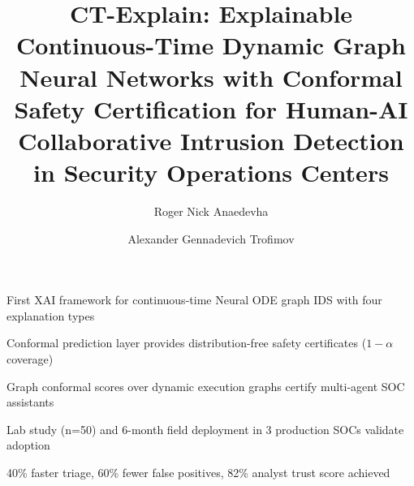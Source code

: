 \documentclass[preprint,review,12pt]{elsarticle}
\begin{document}
\begin{frontmatter}

\title{CT-Explain: Explainable Continuous-Time Dynamic Graph Neural Networks with Conformal Safety Certification for Human-AI Collaborative Intrusion Detection in Security Operations Centers}

\author[mephi]{Roger Nick Anaedevha}

\author[mephi]{Alexander Gennadevich Trofimov}



\begin{highlights}
\item First XAI framework for continuous-time Neural ODE graph IDS with four explanation types
\item Conformal prediction layer provides distribution-free safety certificates ($1{-}\alpha$ coverage)
\item Graph conformal scores over dynamic execution graphs certify multi-agent SOC assistants
\item Lab study (n=50) and 6-month field deployment in 3 production SOCs validate adoption
\item 40\% faster triage, 60\% fewer false positives, 82\% analyst trust score achieved
\end{highlights}


\end{frontmatter}
\end{document}
